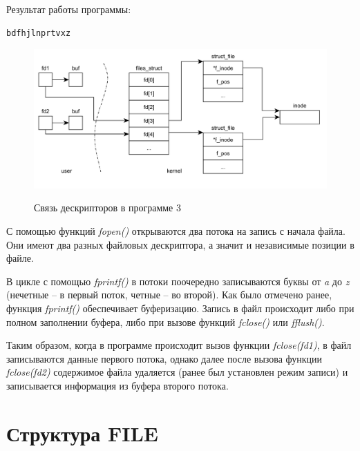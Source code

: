 \documentclass[a4paper,12pt]{article}
\begin{document}
	Результат работы программы:
	
	\begin{lstlisting}[label = lst3, caption = Результат testFopen.out]
	bdfhjlnprtvxz
	\end{lstlisting}
	
	\begin{figure}[h!]
		\begin{center}
			{\includegraphics[scale = 0.7]{page3.png}}
			\label{ris:page3}
		\end{center}
		\caption{Связь дескрипторов в программе 3}
	\end{figure}
	
	С помощью функций \textit{fopen()} открываются два потока на запись с начала
	файла. Они имеют два разных файловых дескриптора, а значит и независимые
	позиции в файле.
	
	В цикле с помощью \textit{fprintf()} в потоки поочередно записываются буквы
	от \textit{a} до \textit{z} (нечетные – в первый поток, четные – во второй). Как было отмечено
	ранее, функция \textit{fprintf()} обеспечивает буферизацию. Запись в файл происходит либо при полном заполнении буфера, либо при вызове функций \textit{fclose()}
	или   \textit{fflush()}.
	
	Таким образом, когда в программе происходит вызов функции \textit{fclose(fd1)}, в файл записываются данные первого потока, однако далее после вызова функции \textit{fclose(fd2)} содержимое файла удаляется (ранее был установлен режим
	записи) и записывается информация из буфера второго потока.
	
	\section*{Структура FILE}
	
\end{document}
